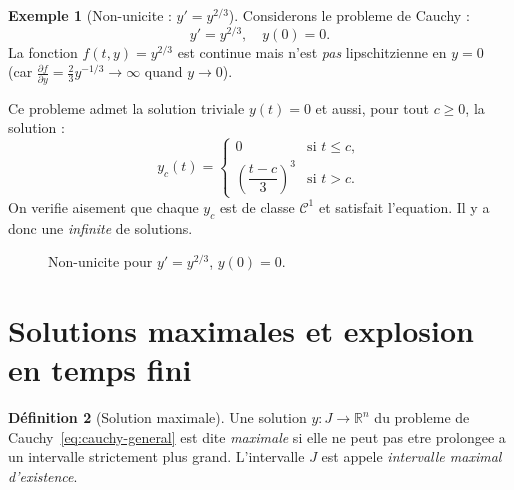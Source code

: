 \documentclass[12pt,a4paper,openany]{book}
\theoremstyle{definition}
\newtheorem{definition}{Définition}[chapter]
\newtheorem{exemple}[definition]{Exemple}
\theoremstyle{plain}
\theoremstyle{remark}
\newcommand{\R}{\mathbb{R}}
\begin{document}
\begin{exemple}[Non-unicite : $y' = y^{2/3}$]\label{ex:non-unicite}
Considerons le probleme de Cauchy :
\[
  y' = y^{2/3}, \quad y(0) = 0.
\]
La fonction $f(t,y) = y^{2/3}$ est continue mais n'est \emph{pas} lipschitzienne en $y = 0$ (car $\frac{\partial f}{\partial y} = \frac{2}{3} y^{-1/3} \to \infty$ quand $y \to 0$).

Ce probleme admet la solution triviale $y(t) = 0$ et aussi, pour tout $c \geq 0$, la solution :
\[
  y_c(t) = \begin{cases} 0 & \text{si } t \leq c, \\ \left(\dfrac{t - c}{3}\right)^3 & \text{si } t > c. \end{cases}
\]
On verifie aisement que chaque $y_c$ est de classe $\mathcal{C}^1$ et satisfait l'equation. Il y a donc une \emph{infinite} de solutions.
\end{exemple}

\begin{figure}[ht]
\centering
{}
\caption{Non-unicite pour $y' = y^{2/3}$, $y(0) = 0$.}\label{fig:non-unicite}
\end{figure}

\section{Solutions maximales et explosion en temps fini}\label{sec:solutions-maximales}

\begin{definition}[Solution maximale]\label{def:solution-maximale}
Une solution $y : J \to \R^n$ du probleme de Cauchy~\eqref{eq:cauchy-general} est dite \emph{maximale} si elle ne peut pas etre prolongee a un intervalle strictement plus grand. L'intervalle $J$ est appele \emph{intervalle maximal d'existence}.
\end{definition}
\end{document}
